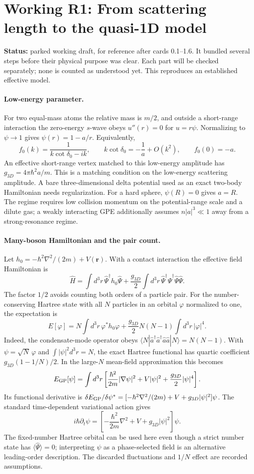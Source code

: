 \section{Working R1: From scattering length to the quasi-1D model}
\label{sec:working-R1}
\noindent\textbf{Status:} parked working draft, for reference after cards 0.1--1.6. It bundled several steps before their physical purpose was clear. Each part will be checked separately; none is counted as understood yet. This reproduces an established effective model.

\paragraph{Low-energy parameter.}
For two equal-mass atoms the relative mass is $m/2$, and outside a short-range interaction the zero-energy $s$-wave obeys $u''(r)=0$ for $u=r\psi$. Normalizing to $\psi\to1$ gives $\psi(r)=1-a/r$. Equivalently,
\[
f_0(k)=\frac1{k\cot\delta_0-ik},\qquad
k\cot\delta_0=-\frac1a+O(k^2),\qquad f_0(0)=-a.
\]
An effective short-range vertex matched to this low-energy amplitude has $g_{3D}=4\pi\hbar^2 a/m$. This is a matching condition on the low-energy scattering amplitude. A bare three-dimensional delta potential used as an exact two-body Hamiltonian needs regularization. For a hard sphere, $\psi(R)=0$ gives $a=R$. The regime requires low collision momentum on the potential-range scale and a dilute gas; a weakly interacting GPE additionally assumes $n|a|^3\ll1$ away from a strong-resonance regime.

\paragraph{Many-boson Hamiltonian and the pair count.}
Let $h_0=-\hbar^2\nabla^2/(2m)+V(\mathbf r)$. With a contact interaction the effective field Hamiltonian is
\[
\hat H=\int d^3r\,\hat\Psi^\dagger h_0\hat\Psi
+\frac{g_{3D}}2\int d^3r\,\hat\Psi^\dagger\hat\Psi^\dagger\hat\Psi\hat\Psi.
\]
The factor $1/2$ avoids counting both orders of a particle pair. For the number-conserving Hartree state with all $N$ particles in an orbital $\varphi$ normalized to one, the expectation is
\[
E[\varphi]=N\int\!d^3r\,\varphi^*h_0\varphi
+\frac{g_{3D}}2N(N-1)\int\!d^3r\,|\varphi|^4.
\]
Indeed, the condensate-mode operator obeys
$\langle N|\hat a^\dagger\hat a^\dagger\hat a\hat a|N\rangle=N(N-1)$.
With $\psi=\sqrt N\,\varphi$ and $\int|\psi|^2d^3r=N$, the exact Hartree functional has quartic coefficient $g_{3D}(1-1/N)/2$. In the large-$N$ mean-field approximation this becomes
\[
E_{\rm GP}[\psi]=\int d^3r\left[
\frac{\hbar^2}{2m}|\nabla\psi|^2+V|\psi|^2
+\frac{g_{3D}}2|\psi|^4\right].
\]
Its functional derivative is
$\delta E_{\rm GP}/\delta\psi^*=[-\hbar^2\nabla^2/(2m)+V+g_{3D}|\psi|^2]\psi$.
The standard time-dependent variational action gives
\[
i\hbar\partial_t\psi=\left[-\frac{\hbar^2}{2m}\nabla^2+V+g_{3D}|\psi|^2\right]\psi.
\]
The fixed-number Hartree orbital can be used here even though a strict number state has $\langle\hat\Psi\rangle=0$; interpreting $\psi$ as a phase-selected field is an alternative leading-order description. The discarded fluctuations and $1/N$ effect are recorded assumptions.

